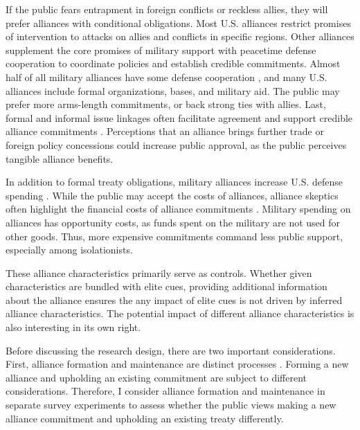 \documentclass[12pt]{article}
\begin{document}
If the public fears entrapment in foreign conflicts or reckless allies, they will prefer alliances with conditional obligations.
Most U.S. alliances restrict promises of intervention to attacks on allies and conflicts in specific regions. 
Other alliances supplement the core promises of military support with peacetime defense cooperation \citep{Morrow1994, LeedsAnac2005} to coordinate policies and establish credible commitments.
Almost half of all military alliances have some defense cooperation \citep{Leedsetal2002}, and many U.S. alliances include formal organizations, bases, and military aid. 
The public may prefer more arms-length commitments, or back strong ties with allies. 
Last, formal and informal issue linkages often facilitate agreement and support credible alliance commitments \citep{Poast2012, Poast2013}. 
Perceptions that an alliance brings further trade or foreign policy concessions could increase public approval, as the public perceives tangible alliance benefits.  



In addition to formal treaty obligations, military alliances increase U.S. defense spending \citep{AlleyFuhrmann2021}. 
While the public may accept the costs of alliances, alliance skeptics often highlight the financial costs of alliance commitments \citep{Posen2014}. 
Military spending on alliances has opportunity costs, as funds spent on the military are not used for other goods. 
Thus, more expensive commitments command less public support, especially among isolationists. 

 
These alliance characteristics primarily serve as controls. 
Whether given characteristics are bundled with elite cues, providing additional information about the alliance ensures the any impact of elite cues is not driven by inferred alliance characteristics.
The potential impact of different alliance characteristics is also interesting in its own right. 


Before discussing the research design, there are two important considerations. 
First, alliance formation and maintenance are distinct processes \citep{Snyder1997}. 
Forming a new alliance and upholding an existing commitment are subject to different considerations.
Therefore, I consider alliance formation and maintenance in separate survey experiments to assess whether the public views making a new alliance commitment and upholding an existing treaty differently. 
\end{document}
